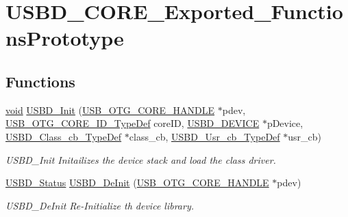 \hypertarget{group___u_s_b_d___c_o_r_e___exported___functions_prototype}{\section{U\-S\-B\-D\-\_\-\-C\-O\-R\-E\-\_\-\-Exported\-\_\-\-Functions\-Prototype}
\label{group___u_s_b_d___c_o_r_e___exported___functions_prototype}
}
\subsection*{Functions}
\begin{DoxyCompactItemize}
\item 
\hyperlink{group___n_a_m_e_ga18028b8badbf1ea7e704ccac3c488e82}{void} \hyperlink{group___u_s_b_d___c_o_r_e___exported___functions_prototype_ga21b6cdd5d4262e72f0c7fed84ecef95c}{U\-S\-B\-D\-\_\-\-Init} (\hyperlink{group___u_s_b___c_o_r_e___exported___types_gaf76054c11eb8a3367907aad7ae700e80}{U\-S\-B\-\_\-\-O\-T\-G\-\_\-\-C\-O\-R\-E\-\_\-\-H\-A\-N\-D\-L\-E} $\ast$pdev, \hyperlink{group___u_s_b___d_e_f_i_n_e_s___exported___types_gab31b9dd0bc08bf6120424c20bda8eb7e}{U\-S\-B\-\_\-\-O\-T\-G\-\_\-\-C\-O\-R\-E\-\_\-\-I\-D\-\_\-\-Type\-Def} core\-I\-D, \hyperlink{group___u_s_b___c_o_r_e___exported___types_ga383d3d5bf4017c2d95af4e092892d946}{U\-S\-B\-D\-\_\-\-D\-E\-V\-I\-C\-E} $\ast$p\-Device, \hyperlink{group___u_s_b___c_o_r_e___exported___types_ga94642fd764d31c3fb97bb089dc94d539}{U\-S\-B\-D\-\_\-\-Class\-\_\-cb\-\_\-\-Type\-Def} $\ast$class\-\_\-cb, \hyperlink{group___u_s_b___c_o_r_e___exported___types_ga333d185c45dd40a75aac486dd49b7160}{U\-S\-B\-D\-\_\-\-Usr\-\_\-cb\-\_\-\-Type\-Def} $\ast$usr\-\_\-cb)
\begin{DoxyCompactList}\small\item\em U\-S\-B\-D\-\_\-\-Init Initailizes the device stack and load the class driver. \end{DoxyCompactList}\item 
\hyperlink{group___u_s_b_d___c_o_r_e___exported___defines_ga1c59ec10075b576176aa51c9ef4e9fc4}{U\-S\-B\-D\-\_\-\-Status} \hyperlink{group___u_s_b_d___c_o_r_e___exported___functions_prototype_ga64e0f6ef918a3ffff2b1506ef0684095}{U\-S\-B\-D\-\_\-\-De\-Init} (\hyperlink{group___u_s_b___c_o_r_e___exported___types_gaf76054c11eb8a3367907aad7ae700e80}{U\-S\-B\-\_\-\-O\-T\-G\-\_\-\-C\-O\-R\-E\-\_\-\-H\-A\-N\-D\-L\-E} $\ast$pdev)
\begin{DoxyCompactList}\small\item\em U\-S\-B\-D\-\_\-\-De\-Init Re-\/\-Initialize th device library. \end{DoxyCompactList}\item 

\end{DoxyCompactItemize}
